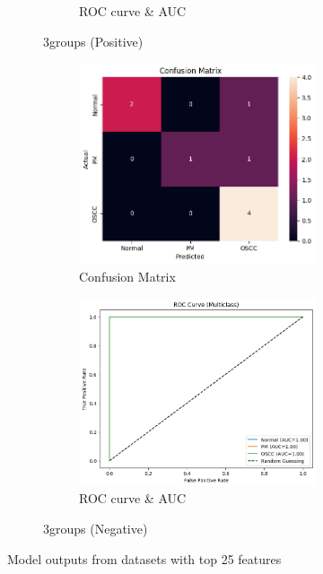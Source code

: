 \documentclass[a4paper,12pt]{article}
\begin{document}
\begin{figure}[H]
\begin{subfigure}[b]{0.45\textwidth}
\begin{subfigure}[b]{0.49\textwidth}
			\caption{ROC curve \& AUC}
			\label{fig:fig6}
		\end{subfigure}
		\caption{3groups (Positive)}
		\label{subfig:3}
	\end{subfigure}
	\hfill
	\begin{subfigure}[b]{0.45\textwidth}
		\centering
		\begin{subfigure}[b]{0.49\textwidth}
			\centering
			\includegraphics[width=\textwidth]{images/3nrc.png}  %
			\caption{Confusion Matrix}
			\label{fig:fig7}
		\end{subfigure}
		\hfill
		\begin{subfigure}[b]{0.49\textwidth}
			\centering
			\includegraphics[width=\textwidth]{images/3nrr.png}  %
			\caption{ROC curve \& AUC}
			\label{fig:fig8}
		\end{subfigure}
		\caption{3groups (Negative)}
		\label{subfig:4}
	\end{subfigure}

	\caption{Model outputs from datasets with top 25 features}
	\label{fig:grid}
\end{figure}
\end{document}
